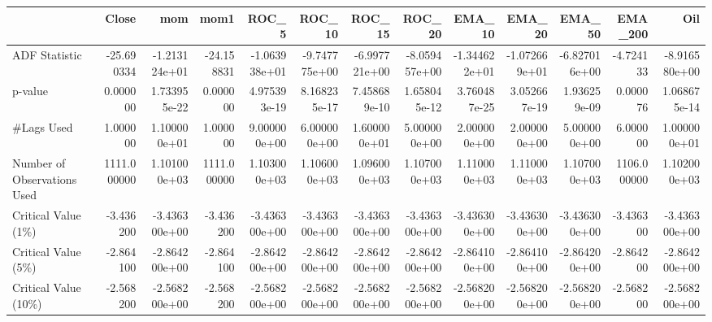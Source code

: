 \begin{tabular}{lrrrrrrrrrrrr}
\toprule
{} &        Close &           mom &         mom1 &         ROC\_5 &        ROC\_10 &        ROC\_15 &        ROC\_20 &        EMA\_10 &        EMA\_20 &        EMA\_50 &      EMA\_200 &           Oil \\
\midrule
ADF Statistic               &   -25.690334 & -1.213124e+01 &   -24.158831 & -1.063938e+01 & -9.747775e+00 & -6.997721e+00 & -8.059457e+00 & -1.344622e+01 & -1.072669e+01 & -6.827016e+00 &    -4.724133 & -8.916580e+00 \\
p-value                     &     0.000000 &  1.733955e-22 &     0.000000 &  4.975393e-19 &  8.168235e-17 &  7.458689e-10 &  1.658045e-12 &  3.760487e-25 &  3.052667e-19 &  1.936259e-09 &     0.000076 &  1.068675e-14 \\
\#Lags Used                  &     1.000000 &  1.100000e+01 &     1.000000 &  9.000000e+00 &  6.000000e+00 &  1.600000e+01 &  5.000000e+00 &  2.000000e+00 &  2.000000e+00 &  5.000000e+00 &     6.000000 &  1.000000e+01 \\
Number of Observations Used &  1111.000000 &  1.101000e+03 &  1111.000000 &  1.103000e+03 &  1.106000e+03 &  1.096000e+03 &  1.107000e+03 &  1.110000e+03 &  1.110000e+03 &  1.107000e+03 &  1106.000000 &  1.102000e+03 \\
Critical Value (1\%)         &    -3.436200 & -3.436300e+00 &    -3.436200 & -3.436300e+00 & -3.436300e+00 & -3.436300e+00 & -3.436300e+00 & -3.436300e+00 & -3.436300e+00 & -3.436300e+00 &    -3.436300 & -3.436300e+00 \\
Critical Value (5\%)         &    -2.864100 & -2.864200e+00 &    -2.864100 & -2.864200e+00 & -2.864200e+00 & -2.864200e+00 & -2.864200e+00 & -2.864100e+00 & -2.864100e+00 & -2.864200e+00 &    -2.864200 & -2.864200e+00 \\
Critical Value (10\%)        &    -2.568200 & -2.568200e+00 &    -2.568200 & -2.568200e+00 & -2.568200e+00 & -2.568200e+00 & -2.568200e+00 & -2.568200e+00 & -2.568200e+00 & -2.568200e+00 &    -2.568200 & -2.568200e+00 \\
\bottomrule
\end{tabular}
